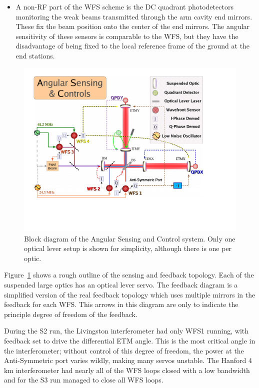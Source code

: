 \begin{itemize}
\item A non-RF part of the WFS scheme is the DC quadrant photodetectors 
      monitoring the weak beams transmitted through the arm cavity end 
      mirrors. These fix the beam position onto the center of the end mirrors.
      The angular sensitivity of these sensors is comparable to the WFS, but
      they have the disadvantage of being fixed to the local reference frame
      of the ground at the end stations.

\end{itemize}


\begin{figure}[!h]
\centerline{\includegraphics[angle=0,width=6.5in]{Figures/Chap5/ASC2.pdf}}
\caption[ASC Block Diagram]{Block diagram of the Angular Sensing and Control
                            system. Only one optical lever setup is shown for
                            simplicity, although there is one per optic.}
\label{fig:ASCblock}
\end{figure}

Figure~\ref{fig:ASCblock} shows a rough outline of the sensing and feedback
topology. Each of the suspended large optics has an optical lever servo. The
feedback diagram is a simplified version of the real feedback topology which
uses multiple mirrors in the feedback for each WFS. This arrows in this diagram
are only to indicate the principle degree of freedom of the feedback. 

During the S2 run, the Livingston interferometer had only WFS1 running,
with feedback set to drive the differential ETM angle. This is the most
critical angle in the interferometer; without control of this degree of
freedom, the power at the Anti-Symmetric port varies wildly, making many
servos unstable. The Hanford 4 km interferometer had nearly all of the 
WFS loops closed with a low bandwidth and for the S3 run managed to close all
WFS loops. 

